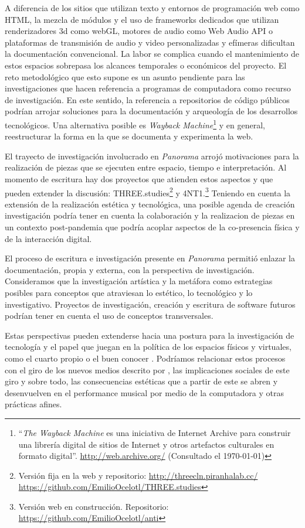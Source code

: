 A diferencia de los sitios que utilizan texto y entornos de programación web como HTML, la mezcla de módulos y el uso de frameworks dedicados que utilizan renderizadores 3d como webGL, motores de audio como Web Audio API o plataformas de transmisión de audio y video personalizadas y efímeras dificultan la documentación convencional. La labor se complica cuando el mantenimiento de estos espacios sobrepasa los alcances temporales o económicos del proyecto. El reto metodológico que esto supone es un asunto pendiente para las investigaciones que hacen referencia a programas de computadora como recurso de investigación. En este sentido, la referencia a repositorios de código públicos podrían arrojar soluciones para la documentación y arqueología de los desarrollos tecnológicos. Una alternativa posible es \textit{Wayback Machine}\footnote{``\textit{The Wayback Machine} es una iniciativa de Internet Archive para construir una librería digital de sitios de Internet y otros artefactos culturales en formato digital''. \url{http://web.archive.org/} (Consultado el \today)} y en general, reestructurar la forma en la que se documenta y experimenta la web. 


El trayecto de investigación involucrado en \textit{Panorama} arrojó motivaciones para la realización de piezas que se ejecuten entre espacio, tiempo e interpretación. Al momento de escritura hay dos proyectos que atienden estos aspectos y que pueden extender la discusión: THREE.studies\footnote{Versión fija en la web y repositorio: \url{http://threecln.piranhalab.cc/} \url{https://github.com/EmilioOcelotl/THREE.studies}} y 4NT1.\footnote{Versión web en construcción. Repositorio: \url{https://github.com/EmilioOcelotl/anti}} Teniendo en cuenta la extensión de la realización estética y tecnológica, una posible agenda de creación investigación podría tener en cuenta la colaboración y la realizacion de piezas en un contexto post-pandemia que podría acoplar aspectos de la co-presencia física y de la interacción digital. 


El proceso de escritura e investigación presente en \textit{Panorama} permitió enlazar la documentación, propia y externa, con la perspectiva de investigación. Consideramos que la investigación artística y la metáfora como estrategias posibles para conceptos que atraviesan lo estético, lo tecnológico y lo investigativo. Proyectos de investigación, creación y escritura de software futuros podrían tener en cuenta el uso de conceptos transversales. 

Estas perspectivas pueden extenderse hacia una postura para la investigación de tecnología y el papel que juegan en la política de los espacios físicos y virtuales, como el cuarto propio \citep{cuartopropio} o el buen conocer \citep{plato}. Podríamos relacionar estos procesos con el giro de los nuevos medios descrito por \cite{manovichlanguage}, las implicaciones sociales de este giro y sobre todo, las consecuencias estéticas que a partir de este se abren y desenvuelven en el performance musical por medio de la computadora y otras prácticas afines. 

